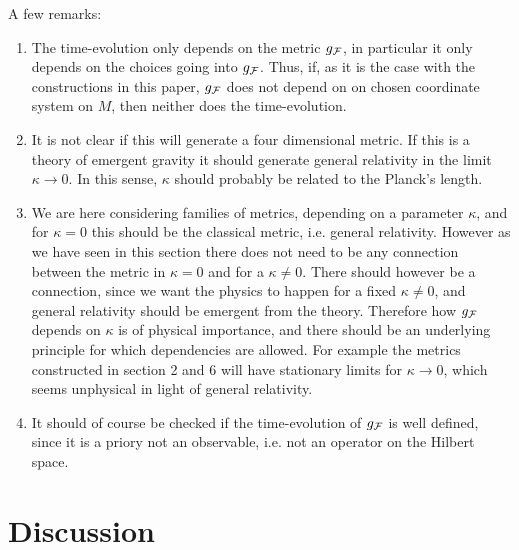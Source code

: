 \documentclass[letterpaper,12pt]{article}
\def\cf{{\cal F}}
\begin{document}
A few remarks: 
\begin{enumerate}
    \item The time-evolution only depends on the metric $g_{\cf}$, in particular it only depends on the choices going into $g_{\cf}$. Thus, if, as it is the case with the constructions in this paper, $g_{\cf}$ does not depend on on chosen coordinate system on $M$, then neither does the time-evolution.
    \item It is not clear if this will generate a four dimensional metric. If this is a theory of emergent gravity it should generate general relativity in the limit $\kappa \to 0$. In this sense, $\kappa$ should probably be related to the Planck's length. 
    \item We are here considering families of metrics, depending on a parameter $\kappa$, and for $\kappa =0$ this should be the classical metric, i.e. general relativity. However as we have seen in this section there does not need to be any connection between the metric in $\kappa =0$ and for a $\kappa \not= 0$. There should however be a connection, since we want the physics to happen for a fixed $\kappa \not=0$, and general relativity should be emergent from the theory. Therefore how $g_{\cf}$ depends on $\kappa$ is of physical importance, and there should be an underlying principle for which dependencies are allowed. For example the metrics constructed in section 2 and 6 will have stationary limits for $\kappa \to 0$, which seems  unphysical in light of general relativity. 
    \item It should of course be checked if the time-evolution of $g_{\cf}$ is well defined, since it is a priory not an observable, i.e. not an operator on the Hilbert space.
\end{enumerate}


































\section{Discussion}
\end{document}
